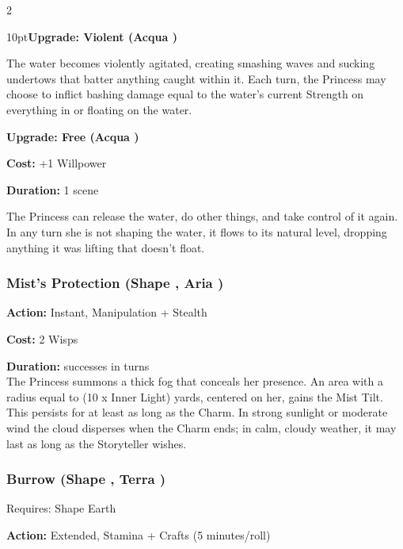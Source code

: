 \begin{multicols}{2}
\begin{myindentpar}{10pt}\textbf{Upgrade: Violent (Acqua \textbullet\textbullet\textbullet)}

The water becomes violently agitated, creating smashing waves and sucking undertows that batter anything caught within it. Each turn, the Princess may choose to inflict bashing damage equal to the water's current Strength on everything in or floating on the water.

\textbf{Upgrade: Free (Acqua \textbullet\textbullet\textbullet\textbullet)}

\noindent \textbf{Cost:} +1 Willpower

\noindent \textbf{Duration:} 1 scene

The Princess can release the water, do other things, and take control of it again. In any turn she is not shaping the water, it flows to its natural level, dropping anything it was lifting that doesn't float.\end{myindentpar}

\subsubsection*{Mist's Protection (Shape \textbullet\textbullet\textbullet, Aria \textbullet\textbullet)}

\noindent \textbf{Action:} Instant, Manipulation + Stealth

\noindent \textbf{Cost:} 2 Wisps

\noindent \textbf{Duration:} successes in turns \\

\noindent The Princess summons a thick fog that conceals her presence. An area with a radius equal to (10 x Inner Light) yards, centered on her, gains the Mist Tilt. This persists for at least as long as the Charm. In strong sunlight or moderate wind the cloud disperses when the Charm ends; in calm, cloudy weather, it may last as long as the Storyteller wishes.




\subsubsection*{Burrow (Shape \textbullet\textbullet\textbullet, Terra \textbullet\textbullet)}

\noindent Requires: Shape Earth

\noindent \textbf{Action:} Extended, Stamina + Crafts (5 minutes/roll)


\end{multicols}
